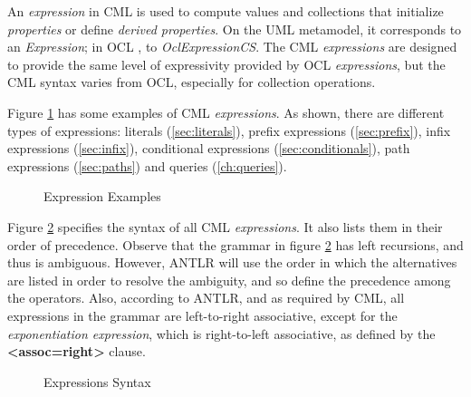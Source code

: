 \begin{definition}
An \emph{expression} in CML is used to compute values and collections that initialize \emph{properties} or define \emph{derived properties}.
On the UML \cite{uml} metamodel,
it corresponds to an \emph{Expression};
in OCL \cite{ocl}, to \emph{OclExpressionCS}.
The CML \emph{expressions} are designed to provide the same level of
expressivity provided by OCL \emph{expressions},
but the CML syntax varies from OCL, especially for collection operations.
\end{definition}

\begin{examples}
Figure \ref{fig:ex:expressions} has some examples of CML \emph{expressions}.
As shown, there are different types of expressions:
literals (\ref{sec:literals}),
prefix expressions (\ref{sec:prefix}),
infix expressions (\ref{sec:infix}),
conditional expressions (\ref{sec:conditionals}),
path expressions (\ref{sec:paths})
and queries (\ref{ch:queries}).
\end{examples}

\begin{figure}
\verbatimfont{\small}

\caption{Expression Examples}
\label{fig:ex:expressions}
\end{figure}

\begin{concrete-syntax}
Figure \ref{fig:stx:expressions} specifies the syntax of all CML \emph{expressions}. It also lists them in their order of precedence.
Observe that the grammar in figure \ref{fig:stx:expressions} has left
recursions, and thus is ambiguous.
However, ANTLR \cite{antlr} will use the order in which the alternatives
are listed in order to resolve the ambiguity,
and so define the precedence among the operators.
Also, according to ANTLR,
and as required by CML,
all expressions in the grammar are left-to-right associative,
except for the \emph{exponentiation expression},
which is right-to-left associative,
as defined by the \textbf{<assoc=right>} clause.
\end{concrete-syntax}

\begin{figure}
\verbatimfont{\small}

\caption{Expressions Syntax}
\label{fig:stx:expressions}
\end{figure}

